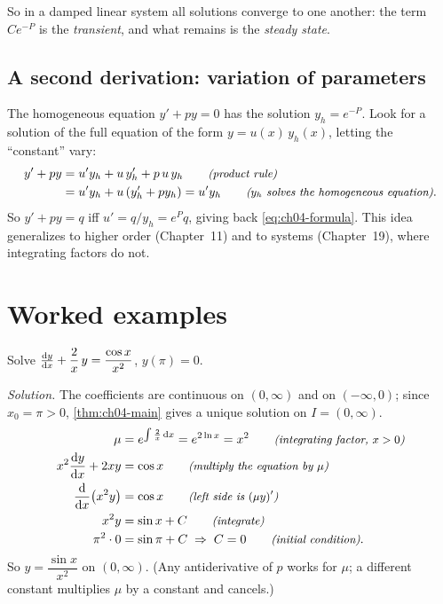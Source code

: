 So in a damped linear system all solutions converge to one another: the term
$Ce^{-P}$ is the \emph{transient}, and what remains is the \emph{steady state}.

\subsection{A second derivation: variation of parameters}

The homogeneous equation $y' + py = 0$ has the solution $y_h = e^{-P}$. Look
for a solution of the full equation of the form $y = u(x)\,y_h(x)$, letting the
``constant'' vary:
\begin{align*}
  y' + py &= u'y_h + u\,y_h' + p\,u\,y_h \qquad\text{\small\itshape(product rule)}\\
          &= u'y_h + u\,(y_h' + py_h) = u'y_h \qquad\text{\small\itshape($y_h$ solves the homogeneous equation)}.
\end{align*}
So $y' + py = q$ iff $u' = q/y_h = e^{P}q$, giving back
\eqref{eq:ch04-formula}. This idea generalizes to higher order (Chapter~11)
and to systems (Chapter~19), where integrating factors do not.

\section{Worked examples}\label{sec:ch04-examples}

\begin{example}\label{ex:ch04-basic}
Solve $\frac{\mathrm{d}y}{\mathrm{d}x} + \dfrac{2}{x}\,y = \dfrac{\cos x}{x^2}$, $y(\pi) = 0$.

\emph{Solution.} The coefficients are continuous on $(0,\infty)$ and on
$(-\infty,0)$; since $x_0 = \pi>0$, \cref{thm:ch04-main} gives a unique
solution on $I = (0,\infty)$.
\begin{align*}
  \mu &= e^{\int\frac2x\,\mathrm{d}x} = e^{2\ln x} = x^2 \qquad\text{\small\itshape(integrating factor, $x>0$)}\\
  x^2\frac{\mathrm{d}y}{\mathrm{d}x} + 2xy &= \cos x \qquad\text{\small\itshape(multiply the equation by $\mu$)}\\
  \frac{\mathrm{d}}{\mathrm{d}x}\bigl(x^2y\bigr) &= \cos x \qquad\text{\small\itshape(left side is $(\mu y)'$)}\\
  x^2y &= \sin x + C \qquad\text{\small\itshape(integrate)}\\
  \pi^2\cdot 0 &= \sin\pi + C\;\Rightarrow\;C = 0 \qquad\text{\small\itshape(initial condition)}.
\end{align*}
So $y = \dfrac{\sin x}{x^2}$ on $(0,\infty)$. (Any antiderivative of $p$ works
for $\mu$; a different constant multiplies $\mu$ by a constant and cancels.)
\end{example}

